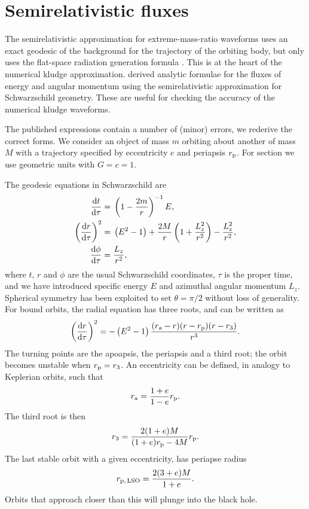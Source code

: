 \chapter{Semirelativistic fluxes}

The semirelativistic approximation for extreme-mass-ratio waveforms uses an exact geodesic of the background for the trajectory of the orbiting body, but only uses the flat-space radiation generation formula \citep{Ruffini1981}. This is at the heart of the numerical kludge approximation. \citet*{Gair2005} derived analytic formulae for the fluxes of energy and angular momentum using the semirelativistic approximation for Schwarzschild geometry. These are useful for checking the accuracy of the numerical kludge waveforms.

The published expressions contain a number of (minor) errors, we rederive the correct forms. We consider an object of mass $m$ orbiting about another of mass $M$ with a trajectory specified by eccentricity $e$ and periapsis $r_\mathrm{p}$. For section we use geometric units with $G = c = 1$.

The geodesic equations in Schwarzschild are
\begin{align}
\frac{\mathrm{d} {t}}{\mathrm{d} {\tau}} = {} & \left(1-\frac{2m}{r}\right)^{-1}E, \\
\left(\frac{\mathrm{d} {r}}{\mathrm{d} {\tau}}\right)^2 = {} & \left(E^2 - 1\right) + \frac{2M}{r}\left(1 + \frac{L_z^2}{r^2}\right) - \frac{L_z^2}{r^2}, \\
\frac{\mathrm{d} {\phi}}{\mathrm{d} {\tau}} = {} & \frac{L_z}{r^2},
\end{align}
where $t$, $r$ and $\phi$ are the usual Schwarzschild coordinates, $\tau$ is the proper time, and we have introduced specific energy $E$ and azimuthal angular momentum $L_z$. Spherical symmetry has been exploited to set $\theta = \pi/2$ without loss of generality. For bound orbits, the radial equation has three roots, and can be written as
\begin{equation}
\left(\frac{\mathrm{d} {r}}{\mathrm{d} {\tau}}\right)^2 = -\left(E^2 - 1\right)\frac{(r_\mathrm{a} - r)(r - r_\mathrm{p})(r - r_3)}{r^3}.
\end{equation}
The turning points are the apoapsis, the periapsis and a third root; the orbit becomes unstable when $r_\mathrm{p} = r_3$. An eccentricity can be defined, in analogy to Keplerian orbits, such that
\begin{equation}
r_\mathrm{a} = \frac{1 + e}{1 - e}r_\mathrm{p}.
\end{equation}
The third root is then
\begin{equation}
r_3 = \frac{2(1 + e)M}{(1+e)r_\mathrm{p} - 4M}r_\mathrm{p}.
\end{equation}
The last stable orbit with a given eccentricity, has periapse radius
\begin{equation}
r_\mathrm{p,\,LSO} = \frac{2(3 + e)M}{1+e}.
\end{equation}
Orbits that approach closer than this will plunge into the black hole.

